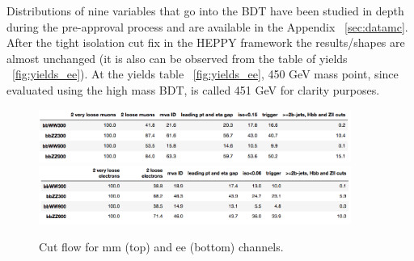 Distributions of nine variables that go into the BDT have been studied in depth during the pre-approval process and are available in the Appendix ~\ref{sec:datamc}. After the tight isolation cut fix in the HEPPY framework the results/shapes are almost unchanged (it is also can be observed from the table of yields ~\ref{fig:yields_ee}).  At the yields table ~\ref{fig:yields_ee}, 450 GeV mass point, since evaluated using the high mass BDT, is called 451 GeV for clarity purposes. 



\begin{figure}[tbp]
  \begin{center}
    \includegraphics[width=0.91\textwidth]{figures/cutflow_mm.png}\\
    \includegraphics[width=0.91\textwidth]{figures/cutflow_ee.png}\\
    \caption{Cut flow for mm (top) and ee (bottom) channels. }
    \label{fig:cutFlow}
  \end{center}
\end{figure}



